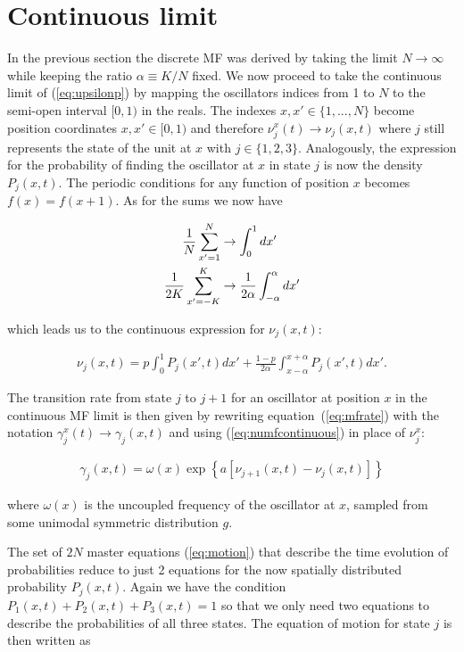 \section{Continuous limit}

In the previous section the discrete MF was derived by taking the limit $N\to\infty$ while keeping the ratio $\alpha\equiv K/N$ fixed.
We now proceed to take the continuous limit of (\ref{eq:upsilonp}) by mapping the oscillators indices from 1 to $N$ to the semi-open
interval $[0,1)$ in the reals. The indexes $x,x' \in \{1,...,N\}$ become position coordinates $x,x'\in [0,1)$ and therefore $\nu^x_j(t)
\to \nu_j(x,t)$ where $j$ still represents the state of the unit at $x$ with $j\in\{1,2,3\}$. Analogously, the expression for the
probability of finding the oscillator at $x$ in state $j$ is now the density $P_j(x,t)$. The periodic conditions for any function of
position $x$ becomes $f(x)=f(x+1)$. As for the sums we now have

\begin{align}
  \frac{1}{N}\sum_{x'=1}^N &\to \int_{0}^{1} dx' \notag\\
  \frac{1}{2K}\sum_{x'=-K}^K &\to \frac{1}{2\alpha}\int_{-\alpha}^{\alpha} dx'
\end{align}

\noindent which leads us to the continuous expression for $\nu_j(x,t)$:

\begin{align}
  \nu_j(x,t) = p \int_0^1 P_j(x',t)dx' + \frac{1-p}{2\alpha}\int_{x-\alpha}^{x+\alpha} P_j(x',t)dx'.
  \label{eq:numfcontinuous}
\end{align}

\noindent The transition rate from state $j$ to $j+1$ for an oscillator at position $x$ in the continuous MF limit is then given by
rewriting equation~(\ref{eq:mfrate}) with the notation $\gamma^x_j(t) \to \gamma_j(x,t)$ and using (\ref{eq:numfcontinuous}) in place
of $\nu^x_j$:

\begin{align}
  \gamma_j(x,t) = \omega(x) \exp\left\{ a\left[ \nu_{j+1}(x,t) - \nu_j(x,t) \right] \right\}
  \label{eq:ratecontinuous}
\end{align}

\noindent where $\omega(x)$ is the uncoupled frequency of the oscillator at $x$, sampled from some unimodal symmetric distribution $g$.

The set of $2N$ master equations (\ref{eq:motion}) that describe the time evolution of probabilities reduce to just 2 equations for the
now spatially distributed probability $P_j(x,t)$. Again we have the condition $P_1(x,t) + P_2(x,t) + P_3(x,t)=1$ so that we only need
two equations to describe the probabilities of all three states. The equation of motion for state $j$ is then written as

